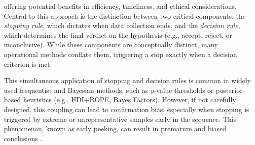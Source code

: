 offering potential benefits in efficiency, timeliness, and ethical considerations.
Central to this approach is the distinction between two critical components:
the \textit{stopping rule}, which dictates when data collection ends, and the \textit{decision rule}, which determines the final verdict on the hypothesis (e.g., accept, reject, or inconclusive). While these components are conceptually distinct, many operational methods conflate them, triggering a stop exactly when a decision criterion is met.

This simultaneous application of stopping and decision rules is common in widely used
frequentist and Bayesian methods, such as p-value thresholds or posterior-based heuristics
(e.g., HDI+ROPE, Bayes Factors). However, if not carefully designed, this coupling can
lead to confirmation bias, especially when stopping is triggered by extreme or
unrepresentative samples early in the sequence.
This phenomenon, known as early peeking, can result in premature and biased conclusions
\citep{simmons2011}.

